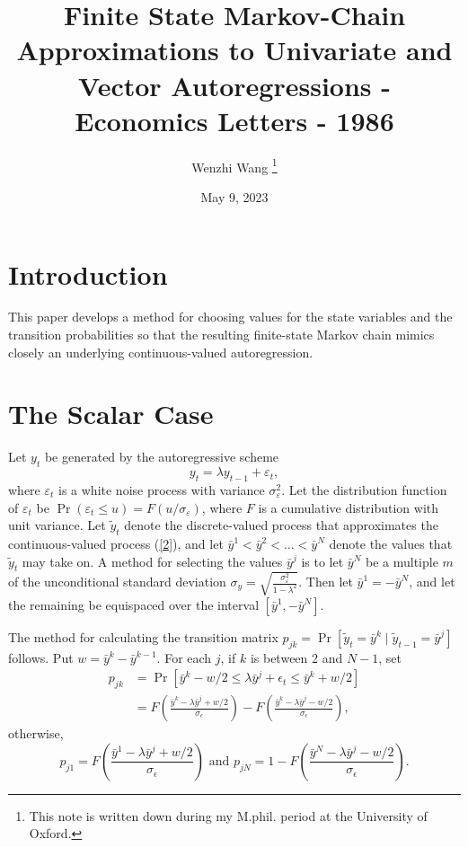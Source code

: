 \documentclass[12pt]{article}
\theoremstyle{definition}
\begin{document}
\title{\bf {Finite State Markov-Chain Approximations to Univariate and Vector Autoregressions - Economics Letters - 1986}}
\author{Wenzhi Wang \thanks{This note is written down during my M.phil. period at the University of Oxford. } }
\date{May 9, 2023}

\maketitle

\section{Introduction}

This paper develops a method for choosing values for the state variables and the transition probabilities so that the resulting finite-state Markov chain mimics closely an underlying continuous-valued autoregression.


\section{The Scalar Case}
Let $y_t$ be generated by the autoregressive scheme
\begin{equation}
	\label{2} \tag{2}
	y_t = \lambda y_{t-1} + \varepsilon_t,
\end{equation}
where $\varepsilon_t$ is a white noise process with variance $\sigma_{\varepsilon}^2$. Let the distribution function of $\varepsilon_t$ be $\operatorname{Pr}(\varepsilon_t \leq u) = F(u/\sigma_{\varepsilon})$, where $F$ is a cumulative distribution with unit variance. Let $\tilde{y}_t$ denote the discrete-valued process that approximates the continuous-valued process (\ref{2}), and let $\bar{y}^1 < \bar{y}^2 < \ldots < \bar{y}^N$ denote the values that $\tilde{y}_t$ may take on. A method for selecting the values $\bar{y}^j$ is to let $\bar{y}^N$ be a multiple $m$ of the unconditional standard deviation $\sigma_y = \sqrt{\frac{\sigma_{\varepsilon}^2}{1-\lambda^2}}$. Then let $\bar{y}^1 = -\bar{y}^N$, and let the remaining be equispaced over the interval $[\bar{y}^1, -\bar{y}^N]$.

The method for calculating the transition matrix $p_{jk} = \operatorname{Pr} \left[\tilde{y}_t = \bar{y}^k \mid \tilde{y}_{t-1} = \bar{y}^j \right]$ follows. Put $w = \bar{y}^k - \bar{y}^{k-1}$. For each $j$, if $k$ is between 2 and $N-1$, set
\begin{equation}
	\label{3a} \tag{3a}
	\begin{aligned}
		p_{j k} & =\operatorname{Pr}\left[\bar{y}^k-w / 2 \leqslant \lambda \bar{y}^j+\epsilon_t \leqslant \bar{y}^k+w / 2\right] \\
		& =F\left(\frac{\bar{y}^k-\lambda \bar{y}^j+w / 2}{\sigma_\epsilon}\right)-F\left(\frac{\bar{y}^k-\lambda \bar{y}^j-w / 2}{\sigma_\epsilon}\right),
	\end{aligned}
\end{equation}
otherwise,
\begin{equation}
	\label{3b} \tag{3b}
	p_{j 1}=F\left(\frac{\bar{y}^1-\lambda \bar{y}^j+w / 2}{\sigma_\epsilon}\right) \text { and } p_{j N}=1-F\left(\frac{\bar{y}^N-\lambda \bar{y}^j-w / 2}{\sigma_\epsilon}\right) .
\end{equation}
\end{document}
